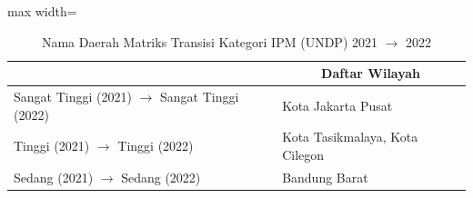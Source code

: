 \begin{table}[H]
\centering
\caption{Nama Daerah Matriks Transisi Kategori IPM (UNDP) 2021 \(\rightarrow\) 2022} \label{tab:sample1ipmname2021x2022}
\begin{adjustbox}{max width=\textwidth}
\begin{tabular}{|>{\centering\arraybackslash}p{4cm}|p{10cm}|}
\hline
\multicolumn{1}{|c|}{\textbf{Kategori}} & \multicolumn{1}{c|}{\textbf{Daftar Wilayah}} \\
\hline
Sangat Tinggi (2021) \(\rightarrow\) Sangat Tinggi (2022) & Kota Jakarta Pusat \\
\hline
Tinggi (2021) \(\rightarrow\) Tinggi (2022) & Kota Tasikmalaya, Kota Cilegon \\
\hline
Sedang (2021) \(\rightarrow\) Sedang (2022) & Bandung Barat \\
\hline
\end{tabular}
\end{adjustbox}
\end{table}